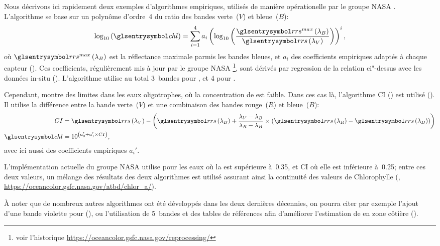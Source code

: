 \begin{technique}
Nous décrivons ici rapidement deux exemples d'algorithmes empiriques, utilisés de manière opérationelle par le groupe NASA .
L'algorithme  se base sur un polynôme d'ordre~4 du ratio des bandes verte~(\(V\)) et bleue~(\(B\)):
\begin{equation} \label{eq:ocx}
  \log_{10}\paren{\am{chl}} =
  \sum_{i=1}^{4} a_i \paren{\log_{10}\paren{
      \frac{ \am{rrs}^{max}\paren{\lambda_B} }
           { \am{rrs}\paren{\lambda_V} }
    }}^i ,
\end{equation}
où \(\am{rrs}^{max}\paren{\lambda_B}\) est la réflectance maximale parmis les bandes bleues, et \(a_i\) des coefficients empiriques adaptés à chaque capteur (\cite{oreilly_1998, oreilly_2000}).
Ces coefficients, régulièrement mis à jour par le groupe NASA \footnote{voir l'historique \url{https://oceancolor.gsfc.nasa.gov/reprocessing/}}, sont dérivés par regression de la relation ci"-dessus avec les données in-situ  (\cite{werdell_2005}).
L'algorithme utilise au total 3~bandes pour , et 4 pour .

Cependant,  montre des limites dans les eaux oligotrophes, où la concentration de  est faible.
Dans ces cas là, l'algorithme CI () est utilisé (\cite{hu_2012}).
Il utilise la différence entre la bande verte~(\(V\)) et une combinaison des bandes rouge~(\(R\)) et bleue~(\(B\)):
\begin{equation}
  \label{eq:CI}
  \begin{split}
    CI &= \am{rrs}\paren{\lambda_V} -
         \paren{
          \am{rrs}\paren{\lambda_B}
          + \frac {\lambda_V - \lambda_B}
                  {\lambda_R - \lambda_B}
          \times \paren{\am{rrs}\paren{\lambda_R}
                      - \am{rrs}\paren{\lambda_B}}
         }
    \\
    \am{chl} &= 10^{\paren{a_0' + a_1' \times CI}},
  \end{split}
\end{equation}
avec ici aussi des coefficients empiriques \(a_i'\).

L'implémentation actuelle du groupe NASA  utilise  pour les eaux où la  est supérieure à~\qty{0.35}{\mgm}, et CI où elle est inférieure à~\qty{0.25}{\mgm}; entre ces deux valeurs, un mélange des résultats des deux algorithmes est utilisé assurant ainsi la continuité des valeurs de Chlorophylle (\cite{oreilly_2019}, \url{https://oceancolor.gsfc.nasa.gov/atbd/chlor_a/}).

À noter que de nombreux autres algorithmes ont été développés dans les deux dernières décennies, on pourra citer par exemple l'ajout d'une bande violette pour  (\cite{oreilly_2019}), ou l'utilisation de 5~bandes et des tables de références afin d'améliorer l'estimation de  en zone côtière (\cite{gohin_2002}).
\end{technique}

